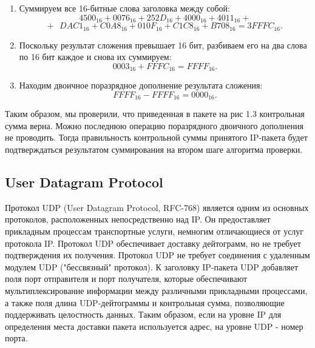 \begin{enumerate}
	\item Суммируем все 16-битные слова заголовка между собой:
	\begin{displaymath} 
	4500_\text{16} + 0076_\text{16} + 252D_\text{16} + 4000_\text{16} + 4011_\text{16} + 
	\end{displaymath}
	\begin{displaymath} 
	+ \text{ }DAC1_\text{16} + C0A8_\text{16} + 010F_\text{16} + C1C8_\text{16} + B708_\text{16} = 3FFFC_\text{16}.
	\end{displaymath}
	\item Поскольку результат сложения превышает 16 бит, разбиваем его на
	два слова по 16 бит каждое и снова их суммируем:
	\begin{displaymath} 
	0003_\text{16} + FFFC_\text{16} = FFFF_\text{16}.
	\end{displaymath}
	\item Находим двоичное поразрядное дополнение результата сложения:
	\begin{displaymath} 
	FFFF_\text{16} - FFFF_\text{16} = 0000_\text{16}.
	\end{displaymath}
\end{enumerate}

Таким образом, мы проверили, что приведенная в пакете на рис 1.3 контрольная сумма верна.
Можно последнюю операцию поразрядного двоичного дополнения не
проводить. Тогда правильность контрольной суммы принятого IP-пакета будет подтверждаться результатом суммирования на втором шаге алгоритма проверки.

\subsection{User Datagram Protocol}
Протокол UDP (User Datagram Protocol, RFC-768) является одним из основных протоколов, расположенных непосредственно над IP. Он предоставляет прикладным процессам транспортные услуги, немногим отличающиеся от услуг протокола IP. Протокол UDP обеспечивает доставку дейтограмм, но не требует подтверждения их получения. Протокол UDP не требует соединения с удаленным модулем UDP ("бессвязный" протокол). К заголовку IP-пакета UDP добавляет поля порт отправителя и порт получателя, которые обеспечивают мультиплексирование информации между различными прикладными процессами, а также поля длина UDP-дейтограммы и контрольная сумма, позволяющие поддерживать целостность данных. Таким образом, если на уровне IP для определения места доставки пакета используется адрес, на уровне UDP - номер порта.

